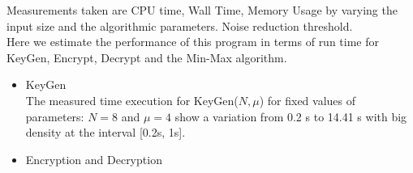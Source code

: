 \documentclass{acm_proc_article-sp}
\begin{document}
Measurements taken are CPU time, Wall Time, Memory Usage by varying the input size  and the algorithmic parameters. Noise reduction threshold.\\
Here we estimate the performance of this program in terms of run time for KeyGen, Encrypt, Decrypt and the Min-Max algorithm.
\begin{itemize}

\item KeyGen\\
The measured time execution for KeyGen($N, \mu$)  for fixed values of parameters: $N=8$ and $\mu = 4$ show a variation from 0.2 s to 14.41 s with big density at the interval [0.2s, 1s].\\

\item {Encryption and Decryption}\\



\end{itemize}
\end{document}
